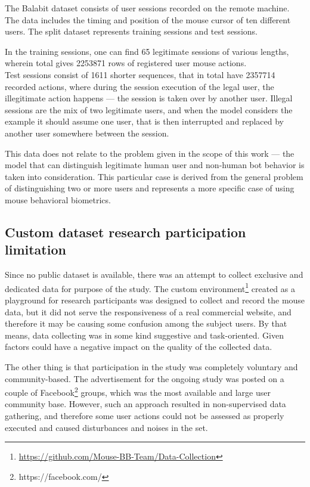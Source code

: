 The Balabit dataset consists of user sessions recorded on the remote machine.
The data includes the timing and position of the mouse cursor of ten different users.
The split dataset represents training sessions and test sessions.

In the training sessions, one can find \num{65} legitimate sessions of various lengths, wherein total gives \num{2253871} rows of registered user mouse actions.\\
Test sessions consist of \num{1611} shorter sequences, that in total have \num{2357714} recorded actions, where during the session execution of the legal user, the illegitimate action happens --- the session is taken over by another user.
Illegal sessions are the mix of two legitimate users, and when the model considers the example it should assume one user, that is then interrupted and replaced by another user somewhere between the session.

This data does not relate to the problem given in the scope of this work --- the model that can distinguish legitimate human user and non-human bot behavior is taken into consideration.
This particular case is derived from the general problem of distinguishing two or more users and represents a more specific case of using mouse behavioral biometrics.

\subsection{Custom dataset research participation limitation}\label{subsec:custom-dataset-research}
Since no public dataset is available, there was an attempt to collect exclusive and dedicated data for purpose of the study.
The custom environment\footnote{\url{https://github.com/Mouse-BB-Team/Data-Collection}} created as a playground for research participants was designed to collect and record the mouse data, but it did not serve the responsiveness of a real commercial website, and therefore it may be causing some confusion among the subject users.
By that means, data collecting was in some kind suggestive and task-oriented.
Given factors could have a negative impact on the quality of the collected data.

The other thing is that participation in the study was completely voluntary and community-based.
The advertisement for the ongoing study was posted on a couple of Facebook\footnote{https://facebook.com/} groups, which was the most available and large user community base.
However, such an approach resulted in non-supervised data gathering, and therefore some user actions could not be assessed as properly executed and caused disturbances and noises in the set.

